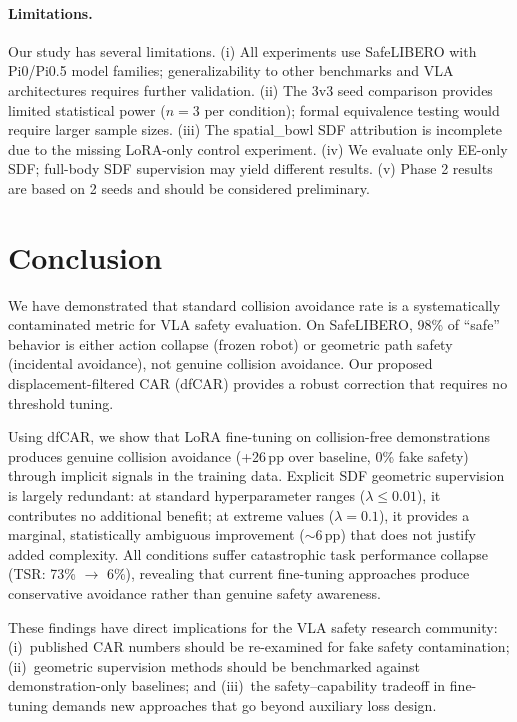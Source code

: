 \documentclass[letterpaper]{article}
\begin{document}
\paragraph{Limitations.}
Our study has several limitations. (i) All experiments use SafeLIBERO with Pi0/Pi0.5 model families; generalizability to other benchmarks and VLA architectures requires further validation. (ii) The 3v3 seed comparison provides limited statistical power ($n=3$ per condition); formal equivalence testing would require larger sample sizes. (iii) The spatial\_bowl SDF attribution is incomplete due to the missing LoRA-only control experiment. (iv) We evaluate only EE-only SDF; full-body SDF supervision may yield different results. (v) Phase 2 results are based on 2 seeds and should be considered preliminary.


\section{Conclusion}
\label{sec:conclusion}

We have demonstrated that standard collision avoidance rate is a systematically contaminated metric for VLA safety evaluation. On SafeLIBERO, 98\% of ``safe'' behavior is either action collapse (frozen robot) or geometric path safety (incidental avoidance), not genuine collision avoidance. Our proposed displacement-filtered CAR (dfCAR) provides a robust correction that requires no threshold tuning.

Using dfCAR, we show that LoRA fine-tuning on collision-free demonstrations produces genuine collision avoidance (+26\,pp over baseline, 0\% fake safety) through implicit signals in the training data. Explicit SDF geometric supervision is largely redundant: at standard hyperparameter ranges ($\lambda \leq 0.01$), it contributes no additional benefit; at extreme values ($\lambda = 0.1$), it provides a marginal, statistically ambiguous improvement (${\sim}$6\,pp) that does not justify added complexity. All conditions suffer catastrophic task performance collapse (TSR: 73\% $\to$ 6\%), revealing that current fine-tuning approaches produce conservative avoidance rather than genuine safety awareness.

These findings have direct implications for the VLA safety research community: (i)~published CAR numbers should be re-examined for fake safety contamination; (ii)~geometric supervision methods should be benchmarked against demonstration-only baselines; and (iii)~the safety--capability tradeoff in fine-tuning demands new approaches that go beyond auxiliary loss design.
\end{document}

